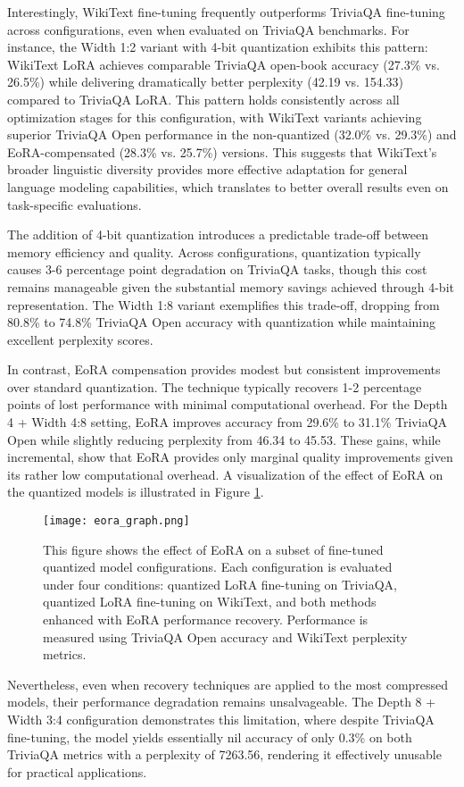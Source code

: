 Interestingly, WikiText fine-tuning frequently outperforms TriviaQA fine-tuning across configurations, even when evaluated on TriviaQA benchmarks. For instance, the Width 1:2 variant with 4-bit quantization exhibits this pattern: WikiText LoRA achieves comparable TriviaQA open-book accuracy (27.3\% vs. 26.5\%) while delivering dramatically better perplexity (42.19 vs. 154.33) compared to TriviaQA LoRA. This pattern holds consistently across all optimization stages for this configuration, with WikiText variants achieving superior TriviaQA Open performance in the non-quantized (32.0\% vs. 29.3\%) and EoRA-compensated (28.3\% vs. 25.7\%) versions. This suggests that WikiText's broader linguistic diversity provides more effective adaptation for general language modeling capabilities, which translates to better overall results even on task-specific evaluations.


The addition of 4-bit quantization introduces a predictable trade-off between memory efficiency and quality. Across configurations, quantization typically causes 3-6 percentage point degradation on TriviaQA tasks, though this cost remains manageable given the substantial memory savings achieved through 4-bit representation. The Width 1:8 variant exemplifies this trade-off, dropping from 80.8\% to 74.8\% TriviaQA Open accuracy with quantization while maintaining excellent perplexity scores.

In contrast, EoRA compensation provides modest but consistent improvements over standard quantization. The technique typically recovers 1-2 percentage points of lost performance with minimal computational overhead. For the Depth 4 + Width 4:8 setting, EoRA improves accuracy from 29.6\% to 31.1\% TriviaQA Open while slightly reducing perplexity from 46.34 to 45.53. These gains, while incremental, show that EoRA provides only marginal quality improvements given its rather low computational overhead. A visualization of the effect of EoRA on the quantized models is illustrated in Figure \ref{fig:graph_eora}.

\begin{figure}[!htbp]
    \centering
    \texttt{[image: eora\_graph.png]}
    \caption[Comparison of Quantized and EoRA Models]{This figure shows the effect of EoRA on a subset of fine-tuned quantized model configurations. Each configuration is evaluated under four conditions: quantized LoRA fine-tuning on TriviaQA, quantized LoRA fine-tuning on WikiText, and both methods enhanced with EoRA performance recovery. Performance is measured using TriviaQA Open accuracy and WikiText perplexity metrics.}
    \label{fig:graph_eora}
\end{figure}

Nevertheless, even when recovery techniques are applied to the most compressed models, their performance degradation remains unsalvageable. The Depth 8 + Width 3:4 configuration demonstrates this limitation, where despite TriviaQA fine-tuning, the model yields essentially nil accuracy of only 0.3\% on both TriviaQA metrics with a perplexity of 7263.56, rendering it effectively unusable for practical applications.